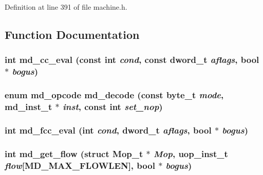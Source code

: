 Definition at line 391 of file machine.h.

\subsection{Function Documentation}
\subsubsection[{md\_\-cc\_\-eval}]{\setlength{\rightskip}{0pt plus 5cm}int md\_\-cc\_\-eval (const int {\em cond}, \/  const {\bf dword\_\-t} {\em aflags}, \/  bool $\ast$ {\em bogus})}\label{machine_8h_02208c8c121b756de2eaef5b169ae3f4}


\subsubsection[{md\_\-decode}]{\setlength{\rightskip}{0pt plus 5cm}enum {\bf md\_\-opcode} md\_\-decode (const {\bf byte\_\-t} {\em mode}, \/  {\bf md\_\-inst\_\-t} $\ast$ {\em inst}, \/  const int {\em set\_\-nop})}\label{machine_8h_1fd90055366ce7d618496a874a3ae28d}


\subsubsection[{md\_\-fcc\_\-eval}]{\setlength{\rightskip}{0pt plus 5cm}int md\_\-fcc\_\-eval (int {\em cond}, \/  {\bf dword\_\-t} {\em aflags}, \/  bool $\ast$ {\em bogus})}\label{machine_8h_1dcf253ea0314c82c9fc5b1697a84721}


\subsubsection[{md\_\-get\_\-flow}]{\setlength{\rightskip}{0pt plus 5cm}int md\_\-get\_\-flow (struct {\bf Mop\_\-t} $\ast$ {\em Mop}, \/  {\bf uop\_\-inst\_\-t} {\em flow}[MD\_\-MAX\_\-FLOWLEN], \/  bool $\ast$ {\em bogus})}\label{machine_8h_b3f57fdb0b3410ba51dc0eafadbaeae8}




